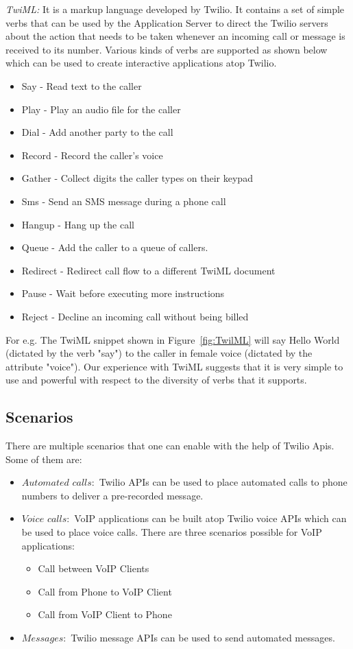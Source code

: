 \emph{TwiML:  } It is a markup language developed by Twilio. It contains a set of simple verbs that can be used by the Application Server to direct the Twilio servers about the action that needs to be taken whenever an incoming call or message is received to its number. Various kinds of verbs are supported as shown below which can be used to create interactive applications atop Twilio.
\begin{itemize}
\item Say - Read text to the caller 
\item Play - Play an audio file for the caller
\item Dial - Add another party to the call
\item Record - Record the caller's voice
\item Gather - Collect digits the caller types on their keypad
\item Sms - Send an SMS message during a phone call
\item Hangup - Hang up the call
\item Queue - Add the caller to a queue of callers.
\item Redirect - Redirect call flow to a different TwiML document
\item Pause - Wait before executing more instructions
\item Reject - Decline an incoming call without being billed
\end{itemize}

For e.g. The TwiML snippet shown in Figure~\ref{fig:TwilML} will say Hello World (dictated by the verb "say") to the caller in female voice (dictated by the attribute "voice"). Our experience with TwiML suggests that it is very simple to use and powerful with respect to the diversity of verbs that it supports.



\subsection{Scenarios}

There are multiple scenarios that one can enable with the help of Twilio Apis. Some of them are:

\begin{itemize}
\item $Automated$ $calls: $ Twilio APIs can be used to place automated calls to phone numbers to deliver a pre-recorded message.
\item $Voice$ $calls: $ VoIP applications can be built atop Twilio voice APIs which can be used to place voice calls. There are three scenarios possible for VoIP applications:  
\begin{itemize}
\item Call between VoIP Clients
\item Call from Phone to VoIP Client
\item Call from VoIP Client to Phone
\end{itemize}
\item $Messages: $ Twilio message APIs can be used to send automated messages.
\end{itemize}



